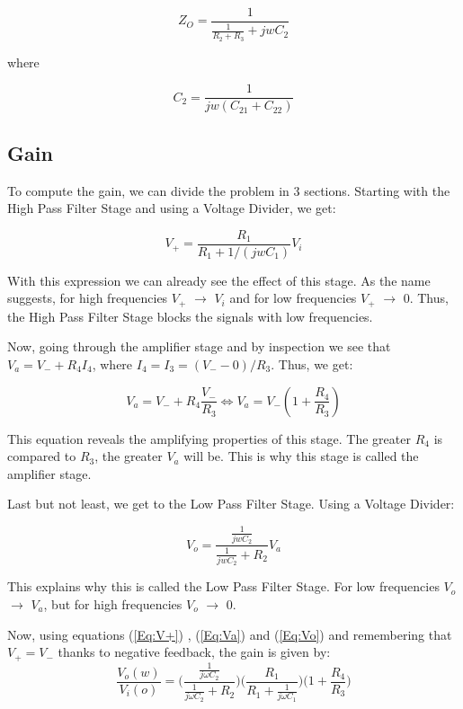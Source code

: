 \begin{equation}
Z_{O}=\frac{1}{\frac{1}{R_2+R_3}+jwC_2}
\end{equation}

where

\begin{equation}
C_2=\frac{1}{jw(C_{21}+C_{22})}
\end{equation}

\subsection{Gain}

To compute the gain, we can divide the problem in 3 sections. Starting with the High Pass Filter Stage and using a Voltage Divider, we get:

\begin{equation}
V_{+}=\frac{R_1}{R_1+1/(jwC_1)}V_i
\label{Eq:V+}
\end{equation}

With this expression we can already see the effect of this stage. As the name suggests, for high frequencies $V_{+}$ $\to$ $V_i$ and for low frequencies $V_{+}$ $\to$ $0$.
Thus, the High Pass Filter Stage blocks the signals with low frequencies.

Now, going through the amplifier stage and by inspection we see that $V_a=V_{-}+R_4I_4$, where $I_4=I_3=(V_{-}-0)/R_3$. Thus, we get:

\begin{equation}
V_a=V_{-}+R_4\frac{V_{-}}{R_3}  \Leftrightarrow V_a = V_{-}\left(1+\frac{R_4}{R_3}\right)
\label{Eq:Va}
\end{equation}

This equation reveals the amplifying properties of this stage. The greater $R_4$ is compared to $R_3$, the greater $V_a$ will be. This is why this stage is called the amplifier stage.\par

Last but not least, we get to the Low Pass Filter Stage. Using a Voltage Divider:

\begin{equation}
  V_o=\frac{\frac{1}{jwC_2}}{\frac{1}{jwC_2}+R_2}V_a
\label{Eq:Vo}
\end{equation}

This explains why this is called the Low Pass Filter Stage. For low frequencies $V_o$ $\to$ $V_a$, but for high frequencies $V_o$ $\to$ $0$.\par

Now, using equations (\ref{Eq:V+}) , (\ref{Eq:Va}) and (\ref{Eq:Vo}) and remembering that $V_{+}=V_{-}$ thanks to negative feedback, the gain is given by:
\begin{equation}
\frac{V_o(w)}{V_i(o)}=\Bigg( \frac{ \frac{1}{j\omega C_2}}{\frac{1}{j\omega C_2}+R_2} \Bigg) \Bigg( \frac{R_1}{R_1+\frac{1}{j\omega C_1}}   \Bigg)  \Bigg( 1+\frac{R_4}{R_3}  \Bigg)
\end{equation}

